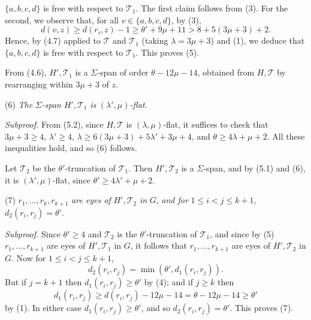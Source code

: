 \noindent $\{a, b, c, d\}$ is free with respect to $\mathcal{T}_1$. The first claim follows from (3). For the second, we observe that, for all $v \in \{a, b, c, d\}$, by (3),
\begin{equation*}
d(v, z) \ge d(r_i, z) - 1 \ge \theta' + 9\mu + 11 > 8 + 5(3\mu + 3) + 2.
\end{equation*}
Hence, by (4.7) applied to $\mathcal{T}$ and $\mathcal{T}_1$ (taking $\lambda = 3\mu + 3$) and (1), we deduce that $\{a, b, c, d\}$ is free with respect to $\mathcal{T}_1$. This proves (5).

From (4.6), $H', \mathcal{T}_1$ is a $\Sigma$-span of order $\theta - 12\mu - 14$, obtained from $H, \mathcal{T}$ by rearranging within $3\mu + 3$ of $z$.

\hspace*{12pt}(6) \textit{The} $\Sigma$\textit{-span} $H', \mathcal{T}_1$ \textit{is} $(\lambda', \mu)$\textit{-flat.}

\textit{Subproof.} From (5.2), since $H, \mathcal{T}$ is $(\lambda, \mu)$-flat, it suffices to check that $3\mu + 3 \ge 4$, $\lambda' \ge 4$, $\lambda \ge 6(3\mu + 3) + 5\lambda' + 3\mu + 4$, and $\theta \ge 4\lambda + \mu + 2$. All these inequalities hold, and so (6) follows.

Let $\mathcal{T}_2$ be the $\theta'$-truncation of $\mathcal{T}_1$. Then $H', \mathcal{T}_2$ is a $\Sigma$-span, and by (5.1) and (6), it is $(\lambda', \mu)$-flat, since $\theta' \ge 4\lambda' + \mu + 2$.

\hspace*{12pt}(7) $r_1, \dots, r_k, r_{k+1}$ \textit{are eyes of} $H', \mathcal{T}_2$ \textit{in} $G$, \textit{and for} $1 \le i < j \le k + 1$, $d_2(r_i, r_j) = \theta'$.

\textit{Subproof.} Since $\theta' \ge 4$ and $\mathcal{T}_2$ is the $\theta'$-truncation of $\mathcal{T}_1$, and since by (5) $r_1, \dots, r_{k+1}$ are eyes of $H', \mathcal{T}_1$ in $G$, it follows that $r_1, \dots, r_{k+1}$ are eyes of $H', \mathcal{T}_2$ in $G$. Now for $1 \le i < j \le k + 1$,
\begin{equation*}
d_2(r_i, r_j) = \min(\theta', d_1(r_i, r_j)).
\end{equation*}
But if $j = k + 1$ then $d_1(r_i, r_j) \ge \theta'$ by (4); and if $j \ge k$ then
\begin{equation*}
d_1(r_i, r_j) \ge d(r_i, r_j) - 12\mu - 14 = \theta - 12\mu - 14 \ge \theta'
\end{equation*}
by (1). In either case $d_1(r_i, r_j) \ge \theta'$, and so $d_2(r_i, r_j) = \theta'$. This proves (7).

